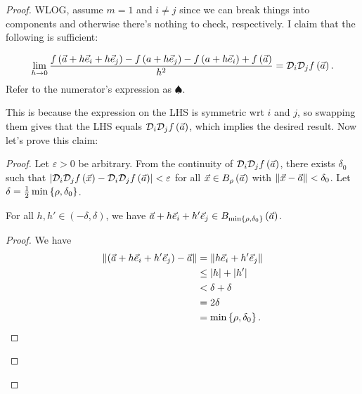 \documentclass[main.tex]{subfiles}
\begin{document}
\begin{proof}
    WLOG, assume $m = 1$ and $i\neq j$ since we can break things into components and otherwise there's nothing to check, respectively. I claim that the following is sufficient:

    \begin{claim}
        \[\lim_{h\to 0} \frac{f\left( \vec{a} + h\vec{e}_i + h\vec{e}_j \right) - f\left( a + h\vec{e}_j \right) - f\left( a + h\vec{e}_i \right) + f\left( \vec{a} \right)}{h^2} = \mathcal{D}_i\mathcal{D}_jf\left( \vec{a} \right).\]
        Refer to the numerator's expression as $\spadesuit$.
    \end{claim}

    This is because the expression on the LHS is symmetric wrt $i$ and $j$, so swapping them gives that the LHS equals $\mathcal{D}_i\mathcal{D}_jf\left( \vec{a} \right)$, which implies the desired result. Now let's prove this claim:

    \begin{proof}
        Let $\varepsilon > 0$ be arbitrary. From the continuity of $\mathcal{D}_i\mathcal{D}_jf\left( \vec{a} \right)$, there exists $\delta_0$ such that $\left\lvert \mathcal{D}_i\mathcal{D}_jf\left( \vec{x} \right) - \mathcal{D}_i\mathcal{D}_jf\left( \vec{a} \right) \right\rvert < \varepsilon$ for all $\vec{x}\in B_\rho\left( \vec{a} \right)$ with $\left\lVert \vec{x} - \vec{a} \right\rVert < \delta_0$. Let $\delta = \frac{1}{2}\min\left\{ \rho, \delta_0 \right\}$.

        \begin{claim}
        \label{subclaim1}
            For all $h, h'\in (-\delta, \delta)$, we have $\vec{a} + h\vec{e}_i + h'\vec{e}_j\in B_{\min\left\{ \rho, \delta_0 \right\}}\left( \vec{a} \right)$.
        \end{claim}

        \begin{proof}
            We have
            \begin{align*}
                \left\lVert \left( \vec{a} + h\vec{e}_i + h'\vec{e}_j \right) - \vec{a} \right\rVert &= \left\lVert h\vec{e}_i + h'\vec{e}_j \right\rVert \\
                &\le \left\lvert h \right\rvert + \left\lvert h' \right\rvert \\
                &< \delta + \delta \\
                &= 2\delta \\
                &= \min\left\{ \rho, \delta_0 \right\}.\qedhere
            \end{align*}
        \end{proof}


\end{proof}
\end{proof}
\end{document}
